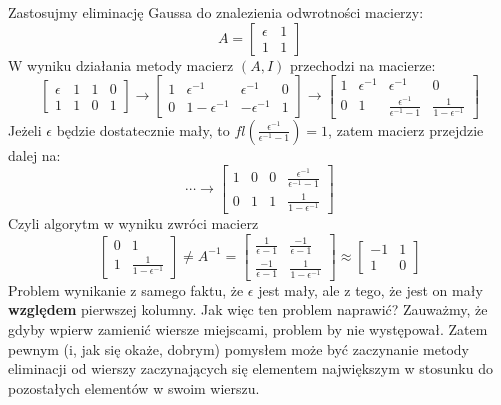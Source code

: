 \documentclass{article}
\begin{document}
Zastosujmy eliminację Gaussa do znalezienia odwrotności macierzy:
\begin{equation}
A =
\begin{bmatrix}
\epsilon & 1 \\ 1 & 1
\end{bmatrix}
\end{equation}
W wyniku działania metody macierz $(A, I)$ przechodzi na macierze:
\begin{equation}
\begin{bmatrix}
\epsilon & 1  & 1 & 0 \\ 1 & 1 & 0 & 1
\end{bmatrix}
\rightarrow
\begin{bmatrix}
1 & \epsilon^{-1} & \epsilon^{-1} & 0 \\ 0 & 1 - \epsilon^{-1} & -\epsilon^{-1} & 1
\end{bmatrix}
\rightarrow
\begin{bmatrix}
1 & \epsilon^{-1} & \epsilon^{-1} & 0 \\ 0 & 1 & \frac{\epsilon^{-1}}{\epsilon^{-1} - 1} & \frac{1}{1 - \epsilon^{-1}}
\end{bmatrix}
\end{equation}
Jeżeli $\epsilon$ będzie dostatecznie mały, to $fl \left( \frac{\epsilon^{-1}}{\epsilon^{-1} - 1} \right) = 1$, zatem macierz przejdzie dalej na:
\begin{equation}
\cdots \rightarrow
\begin{bmatrix}
1 & 0 & 0 & \frac{\epsilon^{-1}}{\epsilon^{-1} - 1} \\ 0 & 1 & 1 & \frac{1}{1 - \epsilon^{-1}}
\end{bmatrix}
\end{equation}
Czyli algorytm w wyniku zwróci macierz
\begin{equation}
\begin{bmatrix}
0 & 1 \\ 1 & \frac{1}{1 - \epsilon^{-1}}
\end{bmatrix}
\ne A^{-1} = 
\begin{bmatrix}
\frac{1}{\epsilon - 1} & \frac{-1}{\epsilon - 1} \\
\frac{-1}{\epsilon - 1} & \frac{1}{1 -  \epsilon^{-1}}
\end{bmatrix} \approx 
\begin{bmatrix}
-1 & 1 \\ 1 & 0
\end{bmatrix}
\end{equation}
Problem wynikanie z samego faktu, że $\epsilon$ jest mały, ale z tego, że jest on mały \textbf{względem} pierwszej kolumny. Jak więc ten problem naprawić? Zauważmy, że gdyby wpierw zamienić wiersze miejscami, problem by nie występował. Zatem pewnym (i, jak się okaże, dobrym) pomysłem może być zaczynanie metody eliminacji od wierszy zaczynających się elementem największym w stosunku do pozostałych elementów w swoim wierszu. 
\end{document}
